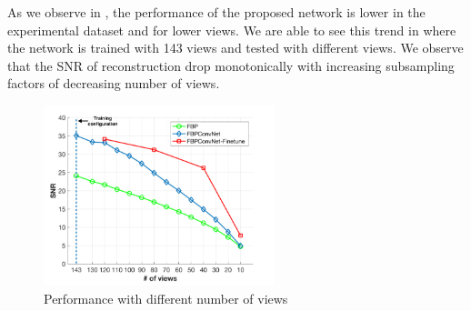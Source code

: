 \documentclass[journal, onecolumn, 11pt]{IEEEtran}
\begin{document}
\begin{table}[h]
\caption{\label{tab:res1}Results for Biomedical Dataset}
\end{table}

\begin{table}[h]
    \caption{\label{tab:res2}Results for Experimental Dataset}
    \end{table}
    
As we observe in , the performance of the proposed network is lower in the experimental dataset and for lower views. We are able to see this trend in  where the network is trained with 143 views and tested with different views. We observe that the SNR of reconstruction drop monotonically with increasing subsampling factors of decreasing number of views. 

\begin{figure}[h]
\centering
\includegraphics[width=0.6\textwidth]{images/viewscompare.png}
\caption{Performance with different number of views}\label{fig:compareview}
\end{figure}
\end{document}
